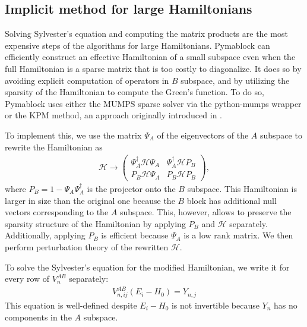 \subsection{Implicit method for large Hamiltonians}

Solving Sylvester's equation and computing the matrix products are the most
expensive steps of the algorithms for large Hamiltonians.
Pymablock can efficiently construct an effective Hamiltonian of a small
subspace even when the full Hamiltonian is a sparse matrix that is too costly to
diagonalize.
It does so by avoiding explicit computation of operators in $B$ subspace, and by
utilizing the sparsity of the Hamiltonian to compute the Green's function.
To do so, Pymablock uses either the MUMPS sparse solver via the python-mumps
wrapper or the KPM method, an approach originally introduced in
\cite{Irfan_2019}.

To implement this, we use the matrix $\Psi_A$ of the eigenvectors of the $A$
subspace to rewrite the Hamiltonian as
%
\begin{align}
\mathcal{H} \to \begin{pmatrix}
\Psi_A^\dagger \mathcal{H} \Psi_A & \Psi_A^\dagger \mathcal{H} P_B \\
P_B \mathcal{H} \Psi_A & P_B \mathcal{H} P_B
\end{pmatrix},
\end{align}
%
where $P_B = 1 - \Psi_A \Psi_A^\dagger$ is the projector onto the $B$ subspace.
This Hamiltonian is larger in size than the original one because the $B$ block has
additional null vectors corresponding to the $A$ subspace.
This, however, allows to preserve the sparsity structure of the Hamiltonian by applying
$P_B$ and $\mathcal{H}$ separately.
Additionally, applying $P_B$ is efficient because $\Psi_A$ is a low rank matrix.
We then perform perturbation theory of the rewritten $\mathcal{H}$.

To solve the Sylvester's equation for the modified Hamiltonian, we write it for
every row of $V_n^{AB}$ separately:
%
\begin{align}
V_{n, ij}^{AB} (E_i - H_0) = Y_{n, j}
\end{align}
%
This equation is well-defined despite $E_i - H_0$ is not invertible because
$Y_{n}$ has no components in the $A$ subspace.
